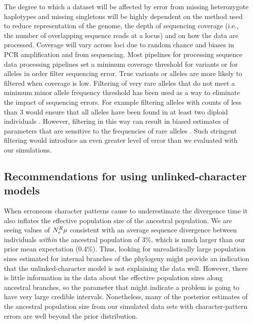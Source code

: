 The degree to which a dataset will be affected by error from missing
heterozygote haplotypes and missing singletons will be highly dependent on the 
method used to reduce representation of the genome, the depth of sequencing 
coverage (i.e., the number of overlapping sequence reads at
a locus) and on how the data are processed. Coverage will vary across loci due 
to random chance and biases in PCR amplification and from sequencing.
Most pipelines for processing sequence data processing pipelines set 
a minimum coverage threshold for variants or for alleles in order filter
sequencing error. True variants or alleles are more likely to filtered when
coverage is low. 
Filtering of very rare alleles that do not meet a minimum minor allele 
frequency threshold has been used as a way to eliminate the impact of 
sequencing errors. 
For example filtering alleles with counts of less than 3 would ensure that all
alleles have been found in at least two diploid individuals
\citep{rochetteStacksAnalyticalMethods2019}.
However, filtering in this way can result in biased estimates of parameters that
are sensitive to the frequencies of rare alleles
\citep{huang2016unforeseen,linckMinorAlleleFrequency2019}.
Such stringent filtering would introduce an even greater level of error than we
evaluated with our simulations.


\subsection{Recommendations for using unlinked-character models}

When erroneous character patterns cause \ecoevolity to underestimate the
divergence time it also inflates the effective population size of the ancestral
population.
We are seeing values of $N_{e}^{R{}}\mu$ consistent with an average sequence
divergence between individuals \emph{within} the ancestral population of 3\%,
which is much larger than our prior mean expectation (0.4\%).
Thus, looking for unrealistically large population sizes estimated for internal
branches of the phylogeny might provide an indication that the
unlinked-character model is not explaining the data well.
However, there is little information in the data about the effective population
sizes along ancestral branches,
so the parameter that might indicate a problem is going to have very
large credible intervals.
Nonetheless, many of the posterior estimates of the ancestral population size
from our simulated data sets with character-pattern errors are well beyond the
prior distribution.

